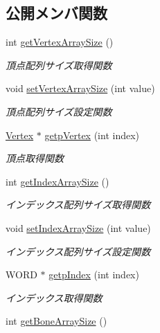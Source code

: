 \subsection*{公開メンバ関数}
\begin{DoxyCompactItemize}
\item 
int \mbox{\hyperlink{class_md_bin_object_1_1_mesh_a60cd3c85b9f5660ae82a74902a5d5af5}{get\+Vertex\+Array\+Size}} ()
\begin{DoxyCompactList}\small\item\em 頂点配列サイズ取得関数 \end{DoxyCompactList}\item 
void \mbox{\hyperlink{class_md_bin_object_1_1_mesh_ac603b4494f9b2ad2e18ee0fb97e88bab}{set\+Vertex\+Array\+Size}} (int value)
\begin{DoxyCompactList}\small\item\em 頂点配列サイズ設定関数 \end{DoxyCompactList}\item 
\mbox{\hyperlink{struct_md_bin_object_1_1_vertex}{Vertex}} $\ast$ \mbox{\hyperlink{class_md_bin_object_1_1_mesh_a5f4f7ae157b3cd20ae2b4039ccf3d613}{getp\+Vertex}} (int index)
\begin{DoxyCompactList}\small\item\em 頂点取得関数 \end{DoxyCompactList}\item 
int \mbox{\hyperlink{class_md_bin_object_1_1_mesh_a8ceb4bee2ee47a34362083f0e95c3cad}{get\+Index\+Array\+Size}} ()
\begin{DoxyCompactList}\small\item\em インデックス配列サイズ取得関数 \end{DoxyCompactList}\item 
void \mbox{\hyperlink{class_md_bin_object_1_1_mesh_a50cefabfd848ba6aa4ab192e1587fb3e}{set\+Index\+Array\+Size}} (int value)
\begin{DoxyCompactList}\small\item\em インデックス配列サイズ設定関数 \end{DoxyCompactList}\item 
W\+O\+RD $\ast$ \mbox{\hyperlink{class_md_bin_object_1_1_mesh_a92e04810b2fafa386142f02128091fdb}{getp\+Index}} (int index)
\begin{DoxyCompactList}\small\item\em インデックス取得関数 \end{DoxyCompactList}\item 
int \mbox{\hyperlink{class_md_bin_object_1_1_mesh_a68046db82ad174df0e993fda7f2bbae1}{get\+Bone\+Array\+Size}} ()

\end{DoxyCompactItemize}
